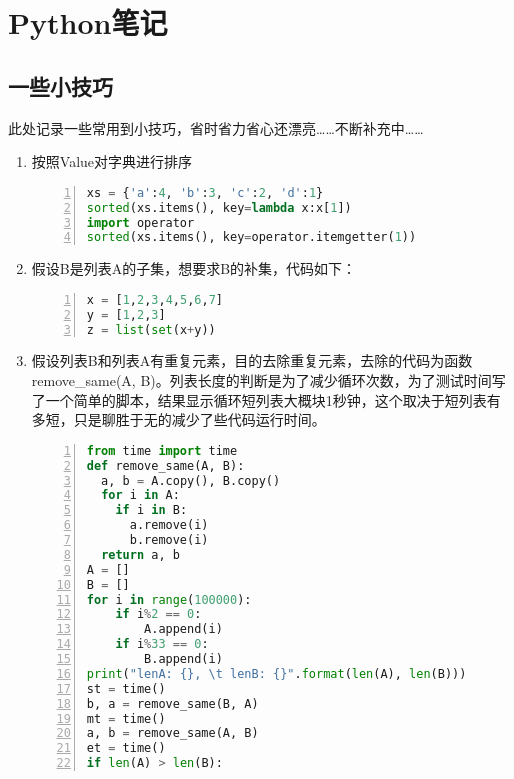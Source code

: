 \chapter{Python笔记}
\section{一些小技巧}
此处记录一些常用到小技巧，省时省力省心还漂亮……不断补充中……
\begin{enumerate}
  \item 按照Value对字典进行排序
    \begin{lstlisting}[language = python, numbers=left, 
             numberstyle=\tiny,keywordstyle=\color{blue!70},
             commentstyle=\color{red!50!green!50!blue!50},frame=shadowbox,
             rulesepcolor=\color{red!20!green!20!blue!20},basicstyle=\ttfamily]
xs = {'a':4, 'b':3, 'c':2, 'd':1}
sorted(xs.items(), key=lambda x:x[1])
import operator
sorted(xs.items(), key=operator.itemgetter(1))
    \end{lstlisting}
  \item 假设B是列表A的子集，想要求B的补集，代码如下：
    \begin{lstlisting}[language = python, numbers=left, 
             numberstyle=\tiny,keywordstyle=\color{blue!70},
             commentstyle=\color{red!50!green!50!blue!50},frame=shadowbox,
             rulesepcolor=\color{red!20!green!20!blue!20},basicstyle=\ttfamily]
x = [1,2,3,4,5,6,7]
y = [1,2,3]
z = list(set(x+y))
    \end{lstlisting}
  \item 假设列表B和列表A有重复元素，目的去除重复元素，去除的代码为函数 remove\_same(A, B)。列表长度的判断是为了减少循环次数，为了测试时间写了一个简单的脚本，结果显示循环短列表大概块1秒钟，这个取决于短列表有多短，只是聊胜于无的减少了些代码运行时间。
    \begin{lstlisting}[language = python, numbers=left, 
             numberstyle=\tiny,keywordstyle=\color{blue!70},
             commentstyle=\color{red!50!green!50!blue!50},frame=shadowbox,
             rulesepcolor=\color{red!20!green!20!blue!20},basicstyle=\ttfamily]
from time import time
def remove_same(A, B):
  a, b = A.copy(), B.copy()
  for i in A:
    if i in B:
      a.remove(i)
      b.remove(i)
  return a, b
A = []
B = []
for i in range(100000):
    if i%2 == 0:
        A.append(i)
    if i%33 == 0:
        B.append(i)
print("lenA: {}, \t lenB: {}".format(len(A), len(B)))
st = time()
b, a = remove_same(B, A)
mt = time()
a, b = remove_same(A, B)
et = time()
if len(A) > len(B):

\end{lstlisting}
\end{enumerate}
